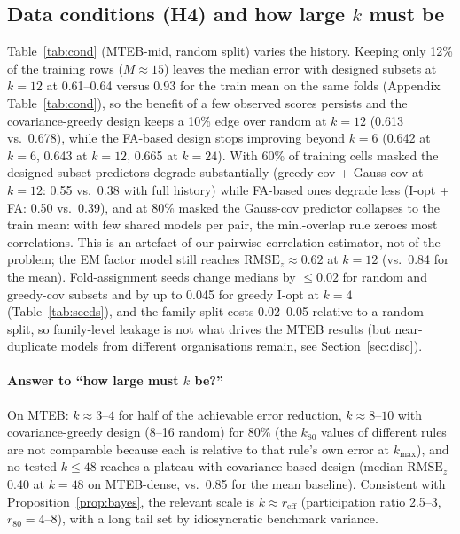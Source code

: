 \documentclass{article}
\newcommand{\rmse}{\mathrm{RMSE}_z}
\begin{document}
\subsection{Data conditions (H4) and how large $k$ must be}
Table~\ref{tab:cond} (MTEB-mid, random split) varies the history. Keeping only 12\% of the training rows ($M\approx15$) leaves the median error with designed subsets at $k=12$ at 0.61--0.64 versus 0.93 for the train mean on the same folds (Appendix Table~\ref{tab:cond}), so the benefit of a few observed scores persists and the covariance-greedy design keeps a 10\% edge over random at $k=12$ (0.613 vs.\ 0.678), while the FA-based design stops improving beyond $k=6$ (0.642 at $k=6$, 0.643 at $k=12$, 0.665 at $k=24$). With 60\% of training cells masked the designed-subset predictors degrade substantially (greedy cov + Gauss-cov at $k=12$: 0.55 vs.\ 0.38 with full history) while FA-based ones degrade less (I-opt + FA: 0.50 vs.\ 0.39), and at 80\% masked the Gauss-cov predictor collapses to the train mean: with few shared models per pair, the min.-overlap rule zeroes most correlations. This is an artefact of our pairwise-correlation estimator, not of the problem; the EM factor model still reaches $\rmse\approx0.62$ at $k=12$ (vs.\ 0.84 for the mean). Fold-assignment seeds change medians by $\le0.02$ for random and greedy-cov subsets and by up to 0.045 for greedy I-opt at $k=4$ (Table~\ref{tab:seeds}), and the family split costs 0.02--0.05 relative to a random split, so family-level leakage is not what drives the MTEB results (but near-duplicate models from different organisations remain, see Section~\ref{sec:disc}).

\paragraph{Answer to ``how large must $k$ be?''} On MTEB: $k\approx3$--$4$ for half of the achievable error reduction, $k\approx8$--$10$ with covariance-greedy design (8--16 random) for 80\% (the $k_{80}$ values of different rules are not comparable because each is relative to that rule's own error at $k_{\max}$), and no tested $k\le48$ reaches a plateau with covariance-based design (median $\rmse$ 0.40 at $k=48$ on MTEB-dense, vs.\ 0.85 for the mean baseline). Consistent with Proposition~\ref{prop:bayes}, the relevant scale is $k\approx r_{\mathrm{eff}}$ (participation ratio 2.5--3, $r_{80}=4$--$8$), with a long tail set by idiosyncratic benchmark variance.

\begin{table}[t]
\caption{How many benchmarks are needed (family split): smallest $k$ closing 50\% / 80\% of the gap between the train-mean error and the error at $k_{\max}$ [95\% bootstrap CI]. For OLB/HELM/LiveBench $k_{\max}\le6$, so these are weakly informative.}\label{tab:kneeded}
\centering\scriptsize\setlength{\tabcolsep}{3pt}
\end{table}
\end{document}
